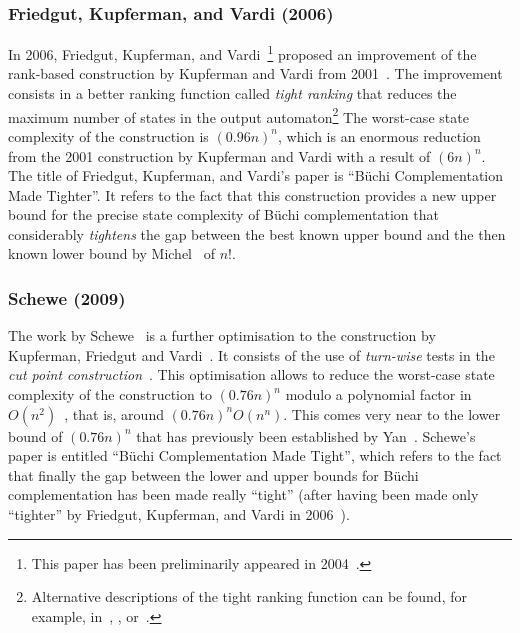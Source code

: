 \subsubsection{Friedgut, Kupferman, and Vardi (2006)}
\label{2_fkv06}
In 2006, Friedgut, Kupferman, and Vardi~\cite{friedgut2006buchi}\footnote{This paper has been preliminarily appeared in 2004~\cite{2004_friedgut}.} proposed an improvement of the rank-based construction by Kupferman and Vardi from 2001~\cite{Kupferman:2001}. The improvement consists in a better ranking function called \textit{tight ranking} that reduces the maximum number of states in the output automaton\footnote{Alternative descriptions of the tight ranking function can be found, for example, in~\cite{fogarty2013unifying}, \cite{schewe2009buchi}, or~\cite{2007_vardi}.} The worst-case state complexity of the construction is $(0.96n)^n$, which is an enormous reduction from the 2001 construction by Kupferman and Vardi with a result of $(6n)^n$. The title of Friedgut, Kupferman, and Vardi's paper is ``Büchi Complementation Made Tighter''. It refers to the fact that this construction provides a new upper bound for the precise state complexity of Büchi complementation that considerably \textit{tightens} the gap between the best known upper bound and the then known lower bound by Michel~\cite{michel1988} of $n!$.



\subsubsection{Schewe (2009)}
\label{2_schewe09}
The work by Schewe~\cite{schewe2009buchi} is a further optimisation to the construction by Kupferman, Friedgut and Vardi~\cite{friedgut2006buchi}. It consists of the use of \textit{turn-wise} tests in the \textit{cut point construction}~\cite{schewe2009buchi}. This optimisation allows to reduce the worst-case state complexity of the construction to $(0.76n)^n$ modulo a polynomial factor in $O(n^2)$~\cite{schewe2009buchi}, that is, around $(0.76n)^nO(n^n)$. This comes very near to the lower bound of $(0.76n)^n$ that has previously been established by Yan~\cite{2006_yan,DBLP:journals/corr/abs-0802-1226}. Schewe's paper is entitled ``Büchi Complementation Made Tight'', which refers to the fact that finally the gap between the lower and upper bounds for Büchi complementation has been made really ``tight'' (after having been made only ``tighter'' by Friedgut, Kupferman, and Vardi in 2006~\cite{friedgut2006buchi}).

